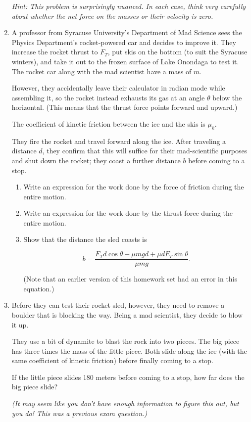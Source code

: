 \documentclass[12pt]{article}
\begin{document}
\begin{enumerate}
{\it Hint: This problem is surprisingly nuanced. In each case, think very carefully about whether the net \rm{force} on the masses \it or their \rm{velocity} \it is zero.}
 
 \bigskip
 
\item A professor from Syracuse University's Department of Mad Science sees the Physics Department's rocket-powered car and decides to improve it. They increase the rocket thrust to $F_T$, put skis on the bottom (to suit the Syracuse winters), and take it out to the frozen surface of Lake Onondaga to test it. The rocket car along with the mad scientist have a mass of $m$. 

However, they accidentally leave their calculator in radian mode while assembling it, so the rocket instead exhausts its gas at an angle $\theta$ below the horizontal. (This means that the thrust force points forward and upward.)

The coefficient of kinetic friction between the ice and the skis is $\mu_k$.

They fire the rocket and travel forward along the ice. After traveling a distance $d$, they confirm that this will suffice for their mad-scientific purposes and shut down the rocket; they coast a further distance $b$ before coming to a stop.

\begin{enumerate}
	\item Write an expression for the work done by the force of friction during the entire motion.
	\item Write an expression for the work done by the thrust force during the entire motion.
	\item Show that the distance the sled coasts is 
	
	$$b=\frac{F_T d \cos \theta - \mu mgd + \mu d F_T \sin \theta}{\mu mg}.$$
	
	(Note that an earlier version of this homework set had an error in this equation.)
\end{enumerate}

\bigskip

\item Before they can test their rocket sled, however, they need to remove a boulder that is blocking the way. Being a mad scientist, they decide to blow it up.

They use a bit of dynamite to blast the rock into two pieces. The big piece has three times the mass of the little piece. Both slide along the ice (with the same coefficient of kinetic friction) before finally coming to a stop.

If the little piece slides 180 meters before coming to a stop, how far does the big piece slide?

{\it (It may seem like you don't have enough information to figure this out, but you do! This was a previous exam question.)}

 

\end{enumerate}
\end{document}
